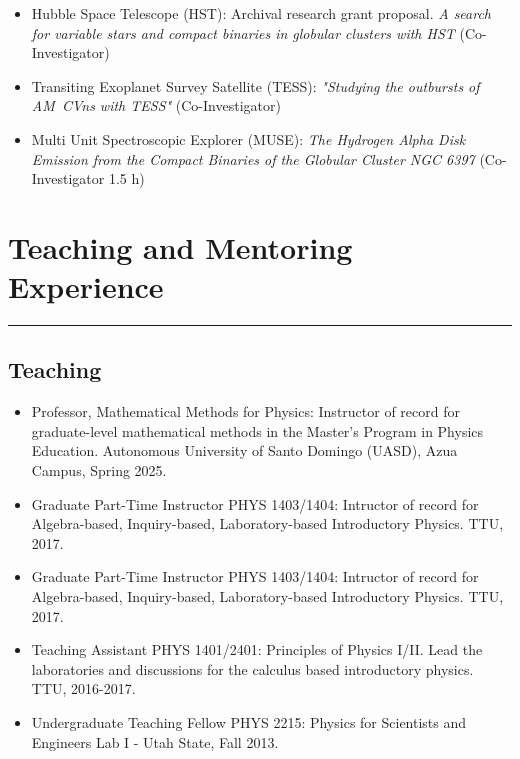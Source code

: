 \documentclass[letterpaper,10pt]{article}
\begin{document}
  \begin{itemize}[label=$\blacktriangleright$]
      \item Hubble Space Telescope (HST):  Archival research grant proposal. \emph{A search for variable stars and compact binaries in globular clusters with HST } (Co-Investigator)
  \end{itemize}




\begin{itemize}[label=$\blacktriangleright$]
      \item   Transiting Exoplanet Survey Satellite (TESS): \emph{"Studying the outbursts of AM~CVns with TESS"} (Co-Investigator)
  \end{itemize}


  \begin{itemize}[label=$\blacktriangleright$]
        \item Multi Unit Spectroscopic Explorer (MUSE): \emph{The Hydrogen Alpha Disk Emission from the Compact Binaries of the Globular Cluster NGC 6397} (Co-Investigator 1.5 h)
  \end{itemize}


\section*{Teaching and Mentoring Experience}

\hrule
\vspace{.3 cm}
\subsection*{Teaching}

\begin{itemize}[label=$\blacktriangleright$]


\item Professor, Mathematical Methods for Physics: Instructor of record for graduate-level mathematical methods in the Master's Program in Physics Education. Autonomous University of Santo Domingo (UASD), Azua Campus, Spring 2025.

\item   Graduate Part-Time Instructor PHYS 1403/1404: Intructor of record for Algebra-based, Inquiry-based, Laboratory-based Introductory Physics. TTU, 2017.  



\item   Graduate Part-Time Instructor PHYS 1403/1404: Intructor of record for Algebra-based, Inquiry-based, Laboratory-based Introductory Physics. TTU, 2017.  
 
 \item   Teaching Assistant  PHYS 1401/2401: Principles of Physics I/II. Lead the laboratories and discussions for the calculus based introductory physics. TTU, 2016-2017.
  

 \item Undergraduate Teaching Fellow  PHYS 2215: Physics for Scientists and Engineers Lab I -  Utah State, Fall 2013.
 
 
 
  \end{itemize}
  
\end{document}
